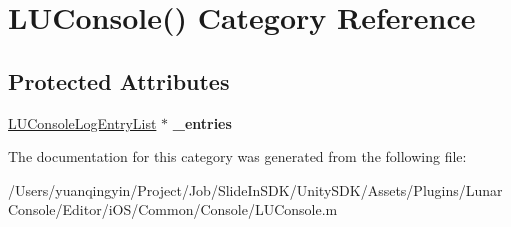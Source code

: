 \hypertarget{category_l_u_console_07_08}{}\section{L\+U\+Console() Category Reference}
\label{category_l_u_console_07_08}
\subsection*{Protected Attributes}
\begin{DoxyCompactItemize}
\item 
\mbox{\label{category_l_u_console_07_08_aff3499632ca45aa376954e89071b3874}} 
\mbox{\hyperlink{interface_l_u_console_log_entry_list}{L\+U\+Console\+Log\+Entry\+List}} $\ast$ {\bfseries \+\_\+entries}
\end{DoxyCompactItemize}


The documentation for this category was generated from the following file\+:\begin{DoxyCompactItemize}
\item 
/\+Users/yuanqingyin/\+Project/\+Job/\+Slide\+In\+S\+D\+K/\+Unity\+S\+D\+K/\+Assets/\+Plugins/\+Lunar\+Console/\+Editor/i\+O\+S/\+Common/\+Console/L\+U\+Console.\+m\end{DoxyCompactItemize}
